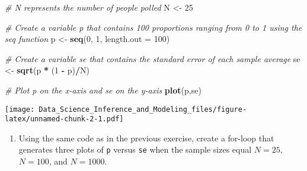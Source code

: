 \documentclass[
]{article}
\newenvironment{Shaded}{\begin{snugshade}}{\end{snugshade}}
\newcommand{\CommentTok}[1]{\textcolor[rgb]{0.56,0.35,0.01}{\textit{#1}}}
\newcommand{\DataTypeTok}[1]{\textcolor[rgb]{0.13,0.29,0.53}{#1}}
\newcommand{\DecValTok}[1]{\textcolor[rgb]{0.00,0.00,0.81}{#1}}
\newcommand{\KeywordTok}[1]{\textcolor[rgb]{0.13,0.29,0.53}{\textbf{#1}}}
\newcommand{\NormalTok}[1]{#1}
\newcommand{\OperatorTok}[1]{\textcolor[rgb]{0.81,0.36,0.00}{\textbf{#1}}}
\newcommand{\StringTok}[1]{\textcolor[rgb]{0.31,0.60,0.02}{#1}}
\providecommand{\tightlist}{%
  \setlength{\itemsep}{0pt}\setlength{\parskip}{0pt}}
\begin{document}
\begin{Shaded}
\begin{Highlighting}[]
\CommentTok{\# \textasciigrave{}N\textasciigrave{} represents the number of people polled}
\NormalTok{N \textless{}{-}}\StringTok{ }\DecValTok{25}

\CommentTok{\# Create a variable \textasciigrave{}p\textasciigrave{} that contains 100 proportions ranging from 0 to 1 using the \textasciigrave{}seq\textasciigrave{} function}
\NormalTok{p \textless{}{-}}\StringTok{ }\KeywordTok{seq}\NormalTok{(}\DecValTok{0}\NormalTok{, }\DecValTok{1}\NormalTok{, }\DataTypeTok{length.out =} \DecValTok{100}\NormalTok{)}

\CommentTok{\# Create a variable \textasciigrave{}se\textasciigrave{} that contains the standard error of each sample average}
\NormalTok{se \textless{}{-}}\StringTok{ }\KeywordTok{sqrt}\NormalTok{(p }\OperatorTok{*}\StringTok{ }\NormalTok{(}\DecValTok{1} \OperatorTok{{-}}\StringTok{ }\NormalTok{p)}\OperatorTok{/}\NormalTok{N)}

\CommentTok{\# Plot \textasciigrave{}p\textasciigrave{} on the x{-}axis and \textasciigrave{}se\textasciigrave{} on the y{-}axis}
\KeywordTok{plot}\NormalTok{(p,se)}
\end{Highlighting}
\end{Shaded}

\texttt{[image: Data\_Science\_Inference\_and\_Modeling\_files/figure-latex/unnamed-chunk-2-1.pdf]}

\begin{enumerate}
\def\labelenumi{\arabic{enumi}.}
\setcounter{enumi}{5}
\tightlist
\item
  Using the same code as in the previous exercise, create a for-loop
  that generates three plots of \texttt{p} versus \texttt{se} when the
  sample sizes equal \(N = 25\), \(N = 100\), and \(N = 1000\).
\end{enumerate}
\end{document}
